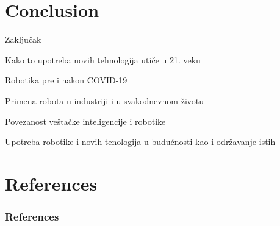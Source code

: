 \documentclass{beamer}
\begin{document}
\section{Conclusion}
\begin{frame}{Zaključak}
\item Kako to upotreba novih tehnologija utiče u 21. veku
\item Robotika pre i nakon COVID-19
\item Primena robota u industriji i u svakodnevnom životu
\item Povezanost veštačke inteligencije i robotike
\item Upotreba robotike i novih tenologija u budućnosti kao i održavanje istih
    
\end{frame}
    
%


\section*{References}
\begin{frame}
    \frametitle{References}
    
    
\end{frame}
\end{document}
